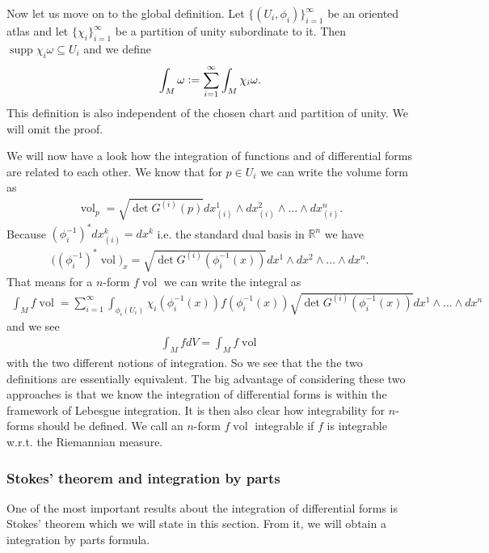 \documentclass[12pt,a4paper]{article}
\numberwithin{equation}{subsection}
\numberwithin{lemma}{subsection}
\theoremstyle{definition}
\DeclareMathOperator{\supp}{supp}
\DeclareMathOperator{\vol}{vol}
\newcommand{\real}{\mathbb{R}}
\begin{document}
Now let us move on to the global definition. Let $\{(U_i,\phi_i)\}_{i=1}^\infty$
be an oriented atlas and let $\{ \chi_i \}_{i=1}^\infty$ be a partition 
of unity subordinate to it. 
Then $\supp \chi_i \omega \subseteq U_i$ 
and we define 
\begin{align*}
    \int_M \omega \vcentcolon= \sum_{i=1}^\infty \int_M \chi_i \omega.
\end{align*} 
This definition is also independent of the chosen chart and partition of 
unity. We will omit the proof. 

We will now have a look how the integration of functions and of 
differential forms are related to each other. 
We know that for $p \in U_i$ we can write the volume form as
\begin{align*}
    \vol_p = \sqrt{ \det G^{(i)}(p)} 
        dx_{(i)}^1 \wedge dx_{(i)}^2 \wedge ... \wedge dx_{(i)}^n.
\end{align*}
Because $(\phi_i^{-1})^* dx_{(i)}^k = dx^k$ i.e. the standard dual basis
in $\real^n$ we have
\begin{align*}
    \big( (\phi_i^{-1})^* \vol)_x =  
        \sqrt{ \det G^{(i)}(\phi_i^{-1}(x))} 
        dx^1 \wedge dx^2 \wedge ... \wedge dx^n.
\end{align*}
That means for a $n$-form $f \vol$ we can write the integral as
\begin{align*}
    \int_M f \vol = \sum_{i=1}^\infty \int_{\phi_i(U_i)} 
    \chi_i(\phi_i^{-1}(x)) f(\phi_i^{-1}(x))
        \sqrt{ \det G^{(i)}(\phi_i^{-1}(x))} dx^1 \wedge ... \wedge dx^n
\end{align*} 
and we see 
\begin{align*}
    \int_M f dV = \int_M f \vol
\end{align*}
with the two different notions of integration. So we see that the
the two definitions are essentially equivalent.
The big advantage of considering these two
approaches is that we know the integration of 
differential forms is within the framework of Lebesgue integration. 
It is then also 
clear how integrability for $n$-forms should be defined. We call an 
$n$-form $f \vol$ integrable if $f$ is integrable w.r.t. the Riemannian measure.

\subsubsection{Stokes' theorem and integration by parts} 

One of the most important results about the integration of differential forms
is Stokes' theorem which we will state in this section. From it, we will 
obtain a integration by parts formula.
\end{document}
